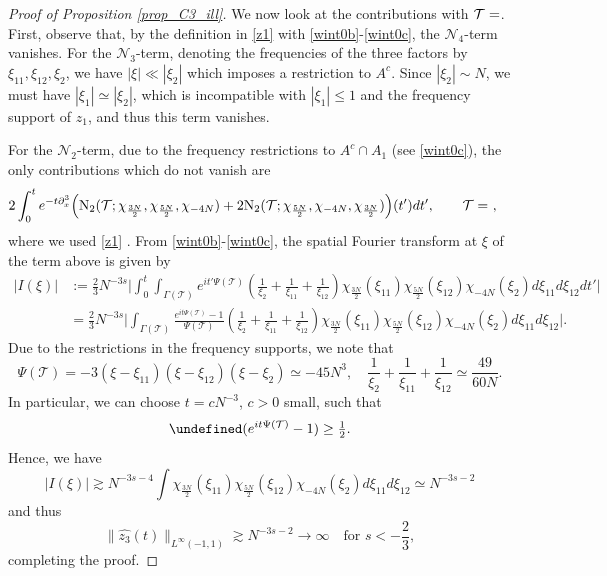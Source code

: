 \documentclass[a4paper,
11pt,  reqno]{amsart}
\makeatletter
\newcommand{\5}{\textup{V}}
\newcommand{\ft}{\widehat}
\newcommand{\dx}{\partial_x}
\theoremstyle{remark}
\let\Re=\undefined\DeclareMathOperator*{\Re}{Re}
\newcommand{\TT}{\mathcal{T}}
\newcommand{\G}{\Gamma}
\def\<#1>{\csname MH@symb@#1\endcsname}
\numberwithin{equation}{section}
\numberwithin{theorem}{section}
\newcommand{\NN}{\mathrm{N}}
\newcommand{\Ncal}{\mathcal{N}}
\makeatother
\begin{document}
\begin{proof}[Proof of Proposition \ref{prop_C3_ill}]
    

    
    

    We now look at the contributions with $\TT=\<21>$. First, observe that, by the definition in \eqref{z1} with \eqref{wint0b}-\eqref{wint0c}, the $\Ncal_4$-term vanishes.
    {
    For the $\Ncal_3$-term, denoting the frequencies of the three factors by $\xi_{11}, \xi_{12}, \xi_2$, 
    we have $|\xi|\ll |\xi_2|$ which imposes a restriction to $A^c$. Since $|\xi_2|\sim N$, we must have $|\xi_1| \simeq |\xi_2|$, which is incompatible with $|\xi_1| \le 1$ and the frequency support of $z_1$, and thus this term vanishes. 
    }
     
    For the $\Ncal_2$-term, due to the frequency restrictions to $A^c \cap A_1$ (see \eqref{wint0c}), the only contributions which do not vanish are
{    
\begin{align}
&
2 \int_0^t e^{-t\dx^3} \Big( 
\NN_2(\TT;  \chi_{\frac{3N}2}, \chi_{\frac{5N}2}, \chi_{-4N})
+ 2 \NN_2(\TT; \chi_{\frac{5N}2}, \chi_{-4N}, \chi_{\frac{3N}2})
\Big)(t') dt',\qquad \TT=\<21>\ ,
\end{align}
where we used
\eqref{z1} .
}
    From \eqref{wint0b}-\eqref{wint0c}, the spatial Fourier transform at $\xi$ of the term above is given by
    {
    \begin{align}
        | I(\xi) |
        & := \tfrac23 N^{-3s}
        \bigg| 
        \int_0^t
        \int_{\G(\TT)} e^{it'\Psi(\TT)}\left(\frac{1}{\xi_2} + \frac{1}{\xi_{11}}  + \frac{1}{\xi_{12}} \right)\chi_{\frac{3N}2}(\xi_{11})\chi_{\frac{5N}2}(\xi_{12})\chi_{-4N}(\xi_{2})d\xi_{11}d\xi_{12} 
        dt'
        \bigg|
        \\
        & = 
        \tfrac{2}{3}
        N^{-3s}
        \bigg| 
        \int_{\G(\TT)} \frac{e^{it\Psi(\TT)}-1}{\Psi(\TT)}\left(\frac{1}{\xi_2} + \frac{1}{\xi_{11}}  + \frac{1}{\xi_{12}} \right)\chi_{\frac{3N}2}(\xi_{11})\chi_{\frac{5N}2}(\xi_{12})\chi_{-4N}(\xi_{2})d\xi_{11}d\xi_{12} 
        \bigg| 
        .
    \end{align}
    }
    Due to the restrictions in the frequency supports, we note that
    $$
     \Psi(\TT)=-3(\xi-\xi_{11})(\xi-\xi_{12})(\xi-\xi_{2}) \simeq -45N^3,\quad \frac{1}{\xi_2} + \frac{1}{\xi_{11}}  + \frac{1}{\xi_{12}} \simeq \frac{49}{60N}. 
    $$
    In particular, we can choose $t=cN^{-3}$, $c>0$ small, such that
    $$
    \Re (e^{it\Psi(\TT)}-1) \ge \tfrac12.
    $$
    Hence, we have
    $$
    |I(\xi)|\gtrsim N^{-3s-4}\int \chi_{\frac{3N}2}(\xi_{11})\chi_{\frac{5N}2}(\xi_{12})\chi_{-4N}(\xi_{2})d\xi_{11}d\xi_{12}  \simeq N^{-3s-2}
    $$
    and thus
    $$
    \|\ft{z_3}(t)\|_{L^{\infty}(-1,1)}\gtrsim N^{-3s-2}\to \infty\quad \mbox{for }s<-\frac{2}{3}, 
    $$
    completing the proof. \qedhere

\end{proof}
\end{document}
